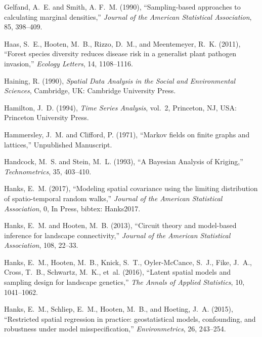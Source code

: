 \documentclass[11pt, titlepage]{article}\usepackage[]{graphicx}\usepackage[]{color}
\begin{document}
\begin{spacing}{1.9}
\begin{flushleft}
\begin{thebibliography}{126}
Gelfand, A.~E. and Smith, A. F.~M. (1990), \enquote{Sampling-based approaches
  to calculating marginal densities,} \textit{Journal of the American
  Statistical Association}, 85, 398--409.

Haas, S.~E., Hooten, M.~B., Rizzo, D.~M., and Meentemeyer, R.~K. (2011),
  \enquote{Forest species diversity reduces disease risk in a generalist plant
  pathogen invasion,} \textit{Ecology Letters}, 14, 1108--1116.

Haining, R. (1990), \textit{Spatial Data Analysis in the Social and
  Environmental Sciences}, Cambridge, UK: Cambridge University Press.

Hamilton, J.~D. (1994), \textit{Time Series Analysis}, vol.~2, Princeton, NJ,
  USA: Princeton University Press.

Hammersley, J.~M. and Clifford, P. (1971), \enquote{Markov fields on finite
  graphs and lattices,} Unpublished Manuscript.

Handcock, M.~S. and Stein, M.~L. (1993), \enquote{A {B}ayesian Analysis of
  Kriging,} \textit{Technometrics}, 35, 403--410.

Hanks, E.~M. (2017), \enquote{Modeling spatial covariance using the limiting
  distribution of spatio-temporal random walks,} \textit{Journal of the
  American Statistical Association}, 0, In Press, bibtex: Hanks2017.

Hanks, E.~M. and Hooten, M.~B. (2013), \enquote{Circuit theory and model-based
  inference for landscape connectivity,} \textit{Journal of the American
  Statistical Association}, 108, 22--33.

Hanks, E.~M., Hooten, M.~B., Knick, S.~T., Oyler-McCance, S.~J., Fike, J.~A.,
  Cross, T.~B., Schwartz, M.~K., et~al. (2016), \enquote{Latent spatial models
  and sampling design for landscape genetics,} \textit{The Annals of Applied
  Statistics}, 10, 1041--1062.

Hanks, E.~M., Schliep, E.~M., Hooten, M.~B., and Hoeting, J.~A. (2015),
  \enquote{Restricted spatial regression in practice: geostatistical models,
  confounding, and robustness under model misspecification,}
  \textit{Environmetrics}, 26, 243--254.


\end{thebibliography}
\end{flushleft}
\end{spacing}
\end{document}
